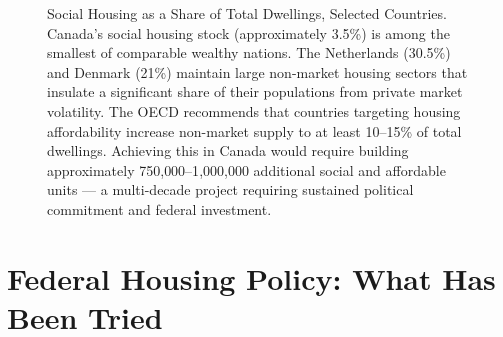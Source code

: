\begin{figure}[H]
\centering
{}
\caption{Social Housing as a Share of Total Dwellings, Selected Countries.
Canada's social housing stock (approximately 3.5\%) is among the smallest
of comparable wealthy nations. The Netherlands (30.5\%) and Denmark (21\%)
maintain large non-market housing sectors that insulate a significant share
of their populations from private market volatility. The OECD recommends
that countries targeting housing affordability increase non-market supply
to at least 10--15\% of total dwellings. Achieving this in Canada would
require building approximately 750{,}000--1{,}000{,}000 additional social
and affordable units --- a multi-decade project requiring sustained political
commitment and federal investment.}
\label{fig:social_housing}
\end{figure}

\section{Federal Housing Policy: What Has Been Tried}
\label{sec:housing_policy}

